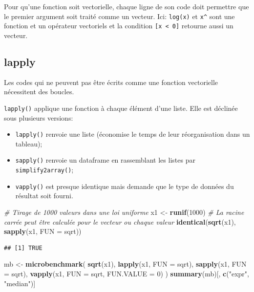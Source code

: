 \documentclass[
  12pt,
  french,
  a4paper,
  extrafontsizes,onecolumn,openright
  ]{memoir}
\newenvironment{Shaded}{\begin{snugshade}}{\end{snugshade}}
\newcommand{\AttributeTok}[1]{\textcolor[rgb]{0.13,0.29,0.53}{#1}}
\newcommand{\CommentTok}[1]{\textcolor[rgb]{0.56,0.35,0.01}{\textit{#1}}}
\newcommand{\DecValTok}[1]{\textcolor[rgb]{0.00,0.00,0.81}{#1}}
\newcommand{\FunctionTok}[1]{\textcolor[rgb]{0.13,0.29,0.53}{\textbf{#1}}}
\newcommand{\NormalTok}[1]{#1}
\newcommand{\OtherTok}[1]{\textcolor[rgb]{0.56,0.35,0.01}{#1}}
\newcommand{\StringTok}[1]{\textcolor[rgb]{0.31,0.60,0.02}{#1}}
\providecommand{\tightlist}{%
  \setlength{\itemsep}{0pt}\setlength{\parskip}{0pt}}
\begin{document}
Pour qu'une fonction soit vectorielle, chaque ligne de son code doit permettre que le premier argument soit traité comme un vecteur.
Ici: \texttt{log(x)} et \texttt{x\^{}} sont une fonction et un opérateur vectoriels et la condition \texttt{{[}x\ \textless{}\ 0{]}} retourne aussi un vecteur.

\subsection{lapply}\label{lapply}

Les codes qui ne peuvent pas être écrits comme une fonction vectorielle nécessitent des boucles.

\texttt{lapply()} applique une fonction à chaque élément d'une liste.
Elle est déclinée sous plusieurs versions:

\begin{itemize}
\tightlist
\item
  \texttt{lapply()} renvoie une liste (économise le temps de leur réorganisation dans un tableau);
\item
  \texttt{sapply()} renvoie un dataframe en rassemblant les listes par \texttt{simplify2array()};
\item
  \texttt{vapply()} est presque identique mais demande que le type de données du résultat soit fourni.
\end{itemize}

\scriptsize

\begin{Shaded}
\begin{Highlighting}[]
\CommentTok{\# Tirage de 1000 valeurs dans une loi uniforme}
\NormalTok{x1 }\OtherTok{\textless{}{-}} \FunctionTok{runif}\NormalTok{(}\DecValTok{1000}\NormalTok{)}
\CommentTok{\# La racine carrée peut être calculée pour le vecteur ou chaque valeur }
\FunctionTok{identical}\NormalTok{(}\FunctionTok{sqrt}\NormalTok{(x1), }\FunctionTok{sapply}\NormalTok{(x1, }\AttributeTok{FUN =}\NormalTok{ sqrt))}
\end{Highlighting}
\end{Shaded}

\begin{verbatim}
## [1] TRUE
\end{verbatim}

\begin{Shaded}
\begin{Highlighting}[]
\NormalTok{mb }\OtherTok{\textless{}{-}} \FunctionTok{microbenchmark}\NormalTok{(}
  \FunctionTok{sqrt}\NormalTok{(x1), }
  \FunctionTok{lapply}\NormalTok{(x1, }\AttributeTok{FUN =}\NormalTok{ sqrt), }
  \FunctionTok{sapply}\NormalTok{(x1, }\AttributeTok{FUN =}\NormalTok{ sqrt), }
  \FunctionTok{vapply}\NormalTok{(x1, }\AttributeTok{FUN =}\NormalTok{ sqrt, }\AttributeTok{FUN.VALUE =} \DecValTok{0}\NormalTok{)}
\NormalTok{)}
\FunctionTok{summary}\NormalTok{(mb)[, }\FunctionTok{c}\NormalTok{(}\StringTok{"expr"}\NormalTok{, }\StringTok{"median"}\NormalTok{)]}
\end{Highlighting}
\end{Shaded}
\end{document}
